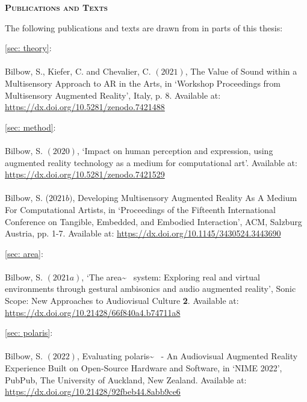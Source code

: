 \begin{center}
	\Huge \textsc{\textbf{Publications and Texts}}
	\hrulefill
\end{center}
\noindent The following publications and texts are drawn from in parts of this thesis:

\noindent\autoref{sec: theory}:  \\ \citep{bilbow2021} \\ Bilbow, S., Kiefer, C. and Chevalier, C. $(2021)$, The Value of Sound within a Multisensory Approach to AR in the Arts, in `Workshop Proceedings from Multisensory Augmented Reality', Italy, p. 8. Available at: \url{https://dx.doi.org/10.5281/zenodo.7421488}
    
\vspace*{0.75cm}
\noindent\autoref{sec: method}:  \\ \citep{bilbow2020,bilbow2021b} \\ Bilbow, S. $(2020)$, `Impact on human perception and expression, using augmented reality technology as a medium for computational art'. Available at: \url{https://dx.doi.org/10.5281/zenodo.7421529} \\ \\ Bilbow, S. ($2021b)$, Developing Multisensory Augmented Reality As A Medium For Computational Artists, in `Proceedings of the Fifteenth International Conference on Tangible, Embedded, and Embodied Interaction', ACM, Salzburg Austria, pp. 1-7. Available at: \url{https://dx.doi.org/10.1145/3430524.3443690}
    
\vspace*{0.75cm}
\noindent\autoref{sec: area}:  \\ \citep{bilbow2021a} \\ Bilbow, S. $(2021a)$, `The area\textasciitilde{}~ system: Exploring real and virtual environments through gestural ambisonics and audio augmented reality', Sonic Scope: New Approaches to Audiovisual Culture \textbf{2}. Available at: \url{https://dx.doi.org/10.21428/66f840a4.b74711a8}
    
\vspace*{0.75cm}
\noindent\autoref{sec: polaris}:  \\ \citep{bilbow2022} \\ Bilbow, S. $(2022)$, Evaluating polaris\textasciitilde{}~ - An Audiovisual Augmented Reality Experience Built on Open-Source Hardware and Software, in `NIME 2022', PubPub, The University of Auckland, New Zealand. Available at: \url{https://dx.doi.org/10.21428/92fbeb44.8abb9ce6}